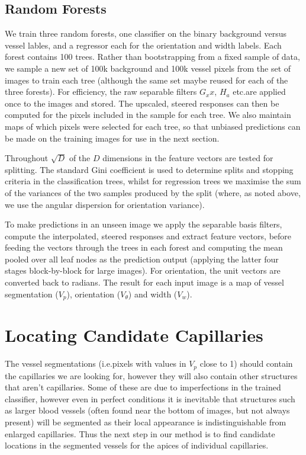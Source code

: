 \documentclass[runningheads,a4paper]{llncs}
\def\ie{i.e.}
\def\etc{etc.}
\begin{document}
\subsection{Random Forests}
We train three random forests, one classifier on the binary background versus vessel lables, and a regressor each for the orientation and width labels. Each forest contains 100 trees. Rather than bootstrapping from a fixed sample of data, we sample a new set of 100k background and 100k vessel pixels from the set of images to train each tree (although the same set maybe reused for each of the three forests). For efficiency, the raw separable filters $G_xx$, $H_a$ \etc are applied once to the images and stored. The upscaled, steered responses can then be computed for the pixels included in the sample for each tree. We also maintain maps of which pixels were selected for each tree, so that unbiased predictions can be made on the training images for use in the next section.

Throughout $\sqrt{D}$ of the $D$ dimensions in the feature vectors are tested for splitting. The standard Gini coefficient is used to determine splits and stopping criteria in the classification trees, whilst for regression trees we maximise the sum of the variances of the two samples produced by the split (where, as noted above, we use the angular dispersion for orientation variance).

To make predictions in an unseen image we apply the separable basis filters, compute the interpolated, steered responses and extract feature vectors, before feeding the vectors through the trees in each forest and computing the mean pooled over all leaf nodes as the prediction output (applying the latter four stages block-by-block for large images). For orientation, the unit vectors are converted back to radians. The result for each input image is a map of vessel segmentation ($V_p$), orientation ($V_\theta$) and width ($V_w$).

\section{Locating Candidate Capillaries}
\label{s:capillary_apexes}
The vessel segmentations (\ie pixels with values in $V_p$ close to 1) should contain the capillaries we are looking for, however they will also contain other structures that aren't capillaries. Some of these are due to imperfections in the trained classifier, however even in perfect conditions it is inevitable that structures such as larger blood vessels (often found near the bottom of images, but not always present) will be segmented as their local appearance is indistinguishable from enlarged capillaries. Thus the next step in our method is to find candidate locations in the segmented vessels for the apices of individual capillaries.
\end{document}
